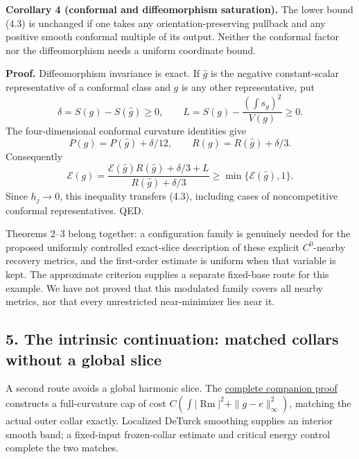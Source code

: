 \documentclass[
  11pt,
]{article}
\begin{document}
\textbf{Corollary 4 (conformal and diffeomorphism saturation).} The
lower bound (4.3) is unchanged if one takes any orientation-preserving
pullback and any positive smooth conformal multiple of its output.
Neither the conformal factor nor the diffeomorphism needs a uniform
coordinate bound.

\textbf{Proof.} Diffeomorphism invariance is exact. If \(\widehat g\) is
the negative constant-scalar representative of a conformal class and
\(g\) is any other representative, put \[
 \delta=S(g)-S(\widehat g)\ge0,\qquad
 L=S(g)-\frac{(\int s_g)^2}{V(g)}\ge0.
\] The four-dimensional conformal curvature identities give \[
 P(g)=P(\widehat g)+\delta/12,\qquad
 R(g)=R(\widehat g)+\delta/3.
\] Consequently \[
 \mathcal E(g)=
 \frac{\mathcal E(\widehat g)R(\widehat g)+\delta/3+L}
      {R(\widehat g)+\delta/3}
 \ge \min\{\mathcal E(\widehat g),1\}.                         \tag{4.5}
\] Since \(h_j\to0\), this inequality transfers (4.3), including cases
of noncompetitive conformal representatives. QED.

Theorems 2--3 belong together: a configuration family is genuinely
needed for the proposed uniformly controlled exact-slice description of
these explicit \(C^0\)-nearby recovery metrics, and the first-order
estimate is uniform when that variable is kept. The approximate
criterion supplies a separate fixed-base route for this example. We have
not proved that this modulated family covers all nearby metrics, nor
that every unrestricted near-minimizer lies near it.

\hypertarget{the-intrinsic-continuation-matched-collars-without-a-global-slice}{%
\subsection{5. The intrinsic continuation: matched collars without a
global
slice}\label{the-intrinsic-continuation-matched-collars-without-a-global-slice}}

A second route avoids a global harmonic slice. The
\href{20260928_intrinsic_caps_and_stability.md}{complete companion
proof} constructs a full-curvature cap of cost
\(C(\int|\operatorname{Rm}|^2+\|g-e\|_\infty^2)\), matching the actual
outer collar exactly. Localized DeTurck smoothing supplies an interior
smooth band; a fixed-input frozen-collar estimate and critical energy
control complete the two matches.
\end{document}
